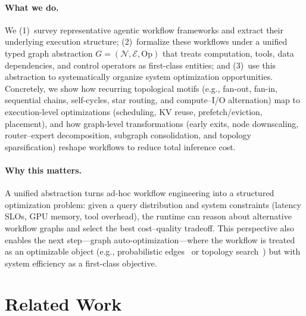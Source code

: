 \paragraph{What we do.}
We (1)~survey representative agentic workflow frameworks and extract their underlying execution structure; (2)~formalize these workflows under a unified typed graph abstraction $G=(\mathcal{N},\mathcal{E},\mathrm{Op})$ that treats computation, tools, data dependencies, and control operators as first-class entities; and (3)~use this abstraction to systematically organize system optimization opportunities. Concretely, we show how recurring topological motifs (e.g., fan-out, fan-in, sequential chains, self-cycles, star routing, and compute--I/O alternation) map to execution-level optimizations (scheduling, KV reuse, prefetch/eviction, placement), and how graph-level transformations (early exits, node downscaling, router--expert decomposition, subgraph consolidation, and topology sparsification) reshape workflows to reduce total inference cost.

\paragraph{Why this matters.}
A unified abstraction turns ad-hoc workflow engineering into a structured optimization problem: given a query distribution and system constraints (latency SLOs, GPU memory, tool overhead), the runtime can reason about alternative workflow graphs and select the best cost--quality tradeoff. This perspective also enables the next step---graph auto-optimization---where the workflow is treated as an optimizable object (e.g., probabilistic edges~\citep{zhuge2024gptswarm} or topology search~\citep{zhang2024aflow}) but with system efficiency as a first-class objective.

\section{Related Work}
\label{sec:related_work}

